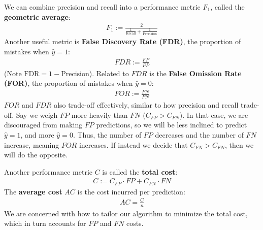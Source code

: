 \documentclass[12pt, a4paper]{article}
\theoremstyle{definition}
\begin{document}
	We can combine precision and recall into a performance metric $F_1$,
	called the \textbf{geometric average}:
	\begin{align*}
		F_1 := \frac{2}{\frac{1}{\text{Recall}} + \frac{1}{\text{Precision}}}
	\end{align*}
	Another useful metric is \textbf{False Discovery Rate (FDR)}, the proportion
	of mistakes when $\hat{y}=1$:
	\begin{align*}
		FDR := \frac{FP}{PP}
	\end{align*}
	(Note $\text{FDR} = 1 - \text{Precision}$).
	Related to $FDR$ is the \textbf{False Omission Rate (FOR)}, the proportion
	of mistakes when $\hat{y}=0$:
	\begin{align*}
		FOR := \frac{FN}{PN}
	\end{align*}
	$FOR$ and $FDR$ also trade-off effectively, similar to how precision and recall
	trade-off.	 Say we weigh $FP$ more heavily than $FN$ ($C_{FP} > C_{FN}$). In that case,
	we are discouraged from making $FP$ predictions, so we will be less inclined
	to predict $\hat{y}=1$, and more $\hat{y}=0$. Thus, the number of $FP$ decreases
	and the number of $FN$ increase, meaning $FOR$ increases. If instead we
	decide that $C_{FN} > C_{FN}$, then we will do the opposite.
	
	Another performance metric $C$ is called the \textbf{total cost}:
	\begin{align*}
		C := C_{FP} \cdot FP + C_{FN} \cdot FN
	\end{align*}
	The \textbf{average cost} $AC$ is the cost incurred per prediction:
	\begin{align*}
		AC = \frac{C}{n}
	\end{align*}
	We are concerned with how to tailor our algorithm to minimize the total cost,
	which in turn accounts for $FP$ and $FN$ costs.
	
\end{document}
